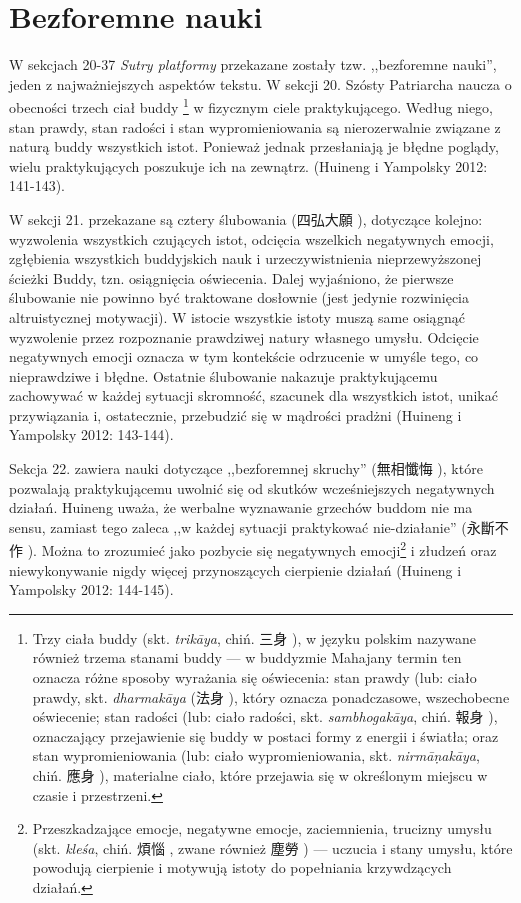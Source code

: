 \section{Bezforemne nauki}
W sekcjach 20-37 \textit{Sutry platformy} przekazane zostały tzw. ,,bezforemne nauki'', jeden z najważniejszych aspektów tekstu. W sekcji 20. Szósty Patriarcha naucza o obecności trzech ciał buddy%
\footnote{Trzy ciała buddy (skt. \textit{trikāya}, chiń. 三身 ), w języku polskim nazywane również trzema stanami buddy --- w buddyzmie Mahajany termin ten oznacza różne sposoby wyrażania się oświecenia: stan prawdy (lub: ciało prawdy, skt. \textit{dharmakāya} (法身 ), który oznacza ponadczasowe, wszechobecne oświecenie; stan radości (lub: ciało radości, skt. \textit{sambhogakāya}, chiń. 報身 ), oznaczający przejawienie się buddy w postaci formy z energii i światła; oraz stan wypromieniowania (lub: ciało wypromieniowania, skt. \textit{nirmā\d{n}akāya}, chiń. 應身 ), materialne ciało, które przejawia się w określonym miejscu w czasie i przestrzeni.}
w fizycznym ciele praktykującego. Według niego, stan prawdy, stan radości i stan wypromieniowania są nierozerwalnie związane z naturą buddy wszystkich istot. Ponieważ jednak przesłaniają je błędne poglądy, wielu praktykujących poszukuje ich na zewnątrz.
(Huineng i Yampolsky 2012: 141-143).

W sekcji 21. przekazane są cztery ślubowania (四弘大願 ), dotyczące kolejno: wyzwolenia wszystkich czujących istot, odcięcia wszelkich negatywnych emocji, zgłębienia wszystkich buddyjskich nauk i urzeczywistnienia nieprzewyższonej ścieżki Buddy, tzn. osiągnięcia oświecenia.
Dalej wyjaśniono, że pierwsze ślubowanie nie powinno być traktowane dosłownie (jest jedynie rozwinięcia altruistycznej motywacji). W istocie wszystkie istoty muszą same osiągnąć wyzwolenie przez rozpoznanie prawdziwej natury własnego umysłu.
Odcięcie negatywnych emocji oznacza w tym kontekście odrzucenie w umyśle tego, co nieprawdziwe i błędne.
Ostatnie ślubowanie nakazuje praktykującemu zachowywać w każdej sytuacji skromność, szacunek dla wszystkich istot, unikać przywiązania i, ostatecznie, przebudzić się w mądrości pradżni
(Huineng i Yampolsky 2012: 143-144).

Sekcja 22. zawiera nauki dotyczące ,,bezforemnej skruchy'' (無相懺悔 ), które pozwalają praktykującemu uwolnić się od skutków wcześniejszych negatywnych działań.
Huineng uważa, że werbalne wyznawanie grzechów buddom nie ma sensu, zamiast tego zaleca ,,w każdej sytuacji praktykować nie-działanie'' (永斷不作 ). Można to zrozumieć jako pozbycie się negatywnych emocji\footnote{Przeszkadzające emocje, negatywne emocje, zaciemnienia, trucizny umysłu (skt. \textit{kleśa}, chiń. 煩惱 , zwane również 塵勞 ) --- uczucia i stany umysłu, które powodują cierpienie i motywują istoty do popełniania krzywdzących działań.} i złudzeń oraz niewykonywanie nigdy więcej przynoszących cierpienie działań (Huineng i Yampolsky 2012: 144-145).

